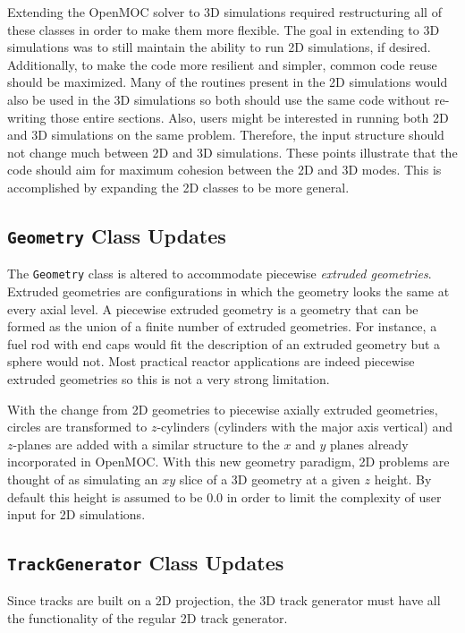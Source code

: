 Extending the OpenMOC solver to 3D simulations required restructuring all of these classes in order to make them more flexible. The goal in extending to 3D simulations was to still maintain the ability to run 2D simulations, if desired. Additionally, to make the code more resilient and simpler, common code reuse should be maximized. Many of the routines present in the 2D simulations would also be used in the 3D simulations so both should use the same code without re-writing those entire sections. Also, users might be interested in running both 2D and 3D simulations on the same problem. Therefore, the input structure should not change much between 2D and 3D simulations. These points illustrate that the code should aim for maximum cohesion between the 2D and 3D modes. This is accomplished by expanding the 2D classes to be more general.

\subsection{\texttt{Geometry} Class Updates}
\label{sec:oo-geometry}

The \texttt{Geometry} class is altered to accommodate piecewise \textit{extruded geometries}. Extruded geometries are configurations in which the geometry looks the same at every axial level. A piecewise extruded geometry is a geometry that can be formed as the union of a finite number of extruded geometries. For instance, a fuel rod with end caps would fit the description of an extruded geometry but a sphere would not. Most practical reactor applications are indeed piecewise extruded geometries so this is not a very strong limitation. 

With the change from 2D geometries to piecewise axially extruded geometries, circles are transformed to $z$-cylinders (cylinders with the major axis vertical) and $z$-planes are added with a similar structure to the $x$ and $y$ planes already incorporated in OpenMOC. With this new geometry paradigm, 2D problems are thought of as simulating an $xy$ slice of a 3D geometry at a given $z$ height. By default this height is assumed to be 0.0 in order to limit the complexity of user input for 2D simulations.

\subsection{\texttt{TrackGenerator} Class Updates}
\label{sec:oo-trackgenerator}

Since tracks are built on a 2D projection, the 3D track generator must have all the functionality of the regular 2D track generator.

